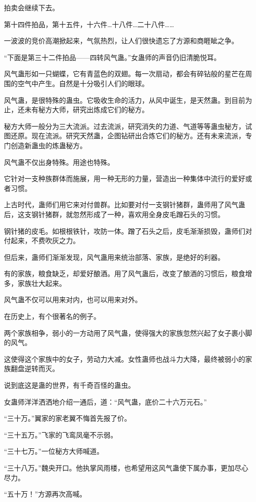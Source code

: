 \begin{this_body}
拍卖会继续下去。

第十四件拍品，第十五件，十六件…十八件…二十八件……

一波波的竞价高潮掀起来，气氛热烈，让人们很快遗忘了方源和商睚眦之争。

“下面是第三十二件拍品——四转风气蛊。”女蛊师的声音仍旧清脆悦耳。

风气蛊形如一只蝴蝶，它有青蓝色的双翅。每一次扇动，都会有碎钻般的星芒在周围的空气中产生。自然是十分吸引人们的眼球。

风气蛊，是很特殊的蛊虫。它吸收生命的活力，从风中诞生，是天然蛊。到目前为止，还未有秘方大师，研究出炼成它们的秘方。

秘方大师一般分为三大流派。过去流派，研究消失的力道、气道等等蛊虫秘方，试图还原。现在流派。研究天然蛊，企图钻研出合炼它们的秘方。还有未来流派，专门创造新蛊虫的炼蛊秘方。

风气蛊不仅出身特殊。用途也特殊。

它针对一支种族群体而施展，用一种无形的力量，营造出一种集体中流行的爱好或者习惯。

上古时代，蛊师们用它来对付兽群。比如要对付一支钢针猪群，蛊师用了风气蛊后，这支钢针猪群，就忽然形成了一种，喜欢用全身皮毛蹭石头的习惯。

钢针猪的皮毛。如根根铁针，攻防一体。蹭了石头之后，皮毛渐渐损毁，蛊师们对付起来，不费吹灰之力。

但后来，蛊师们渐渐发现，风气蛊用来统治部落、家族，是绝好的利器。

有的家族，粮食缺乏，却爱好酿酒。用了风气蛊后，改变了酿酒的习惯后，粮食增多，家族壮大起来。

风气蛊不仅可以用来对内，也可以用来对外。

在历史上，有个很著名的例子。

两个家族相争，弱小的一方动用了风气蛊，使得强大的家族忽然兴起了女子裹小脚的风气。

这使得这个家族中的女子，劳动力大减。女性蛊师也战斗力大降，最终被弱小的家族翻盘逆转而灭。

说到底这是蛊的世界，有千奇百怪的蛊虫。

女蛊师洋洋洒洒地介绍一通后，道：“风气蛊，底价二十六万元石。”

“三十万。”翼家的家老翼不悔首先报了价。

“三十五万。”飞家的飞鸾凤毫不示弱。

“三十七万。”一位秘方大师喊道。

“三十八万。”魏央开口。他执掌风雨楼，也希望用这风气蛊使下属办事，更加尽心尽力。

“五十万！”方源再次高喊。


\end{this_body}
